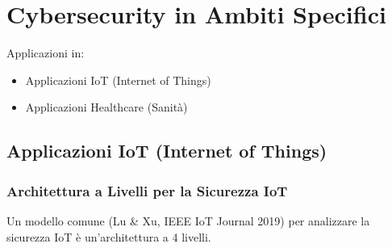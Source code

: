 \section{Cybersecurity in Ambiti Specifici}
Applicazioni in:
\begin{itemize}
    \item Applicazioni IoT (Internet of Things)
    \item Applicazioni Healthcare (Sanità)
\end{itemize}

\subsection{Applicazioni IoT (Internet of Things)}

\subsubsection{Architettura a Livelli per la Sicurezza IoT}
Un modello comune (Lu \& Xu, IEEE IoT Journal 2019) per analizzare la sicurezza IoT è un'architettura a 4 livelli.

